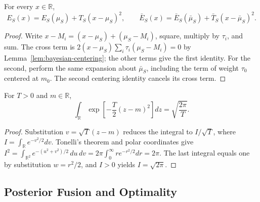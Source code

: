 \begin{mosaiclemma}\label{lem:bayesian-squares}
For every $x\in\mathbb{R}$,
\begin{equation}\label{eq:bayesian-square-completion}
E_S(x)=E_S(\mu_S)+T_S(x-\mu_S)^2,\qquad
\bar E_S(x)=\bar E_S(\bar\mu_S)+\bar T_S(x-\bar\mu_S)^2.
\end{equation}
\end{mosaiclemma}
\begin{proof}
Write $x-M_i=(x-\mu_S)+(\mu_S-M_i)$, square, multiply by $\tau_i$, and sum. The cross term is $2(x-\mu_S)\sum_i\tau_i(\mu_S-M_i)=0$ by Lemma~\ref{lem:bayesian-centering}; the other terms give the first identity. For the second, perform the same expansion about $\bar\mu_S$, including the term of weight $\tau_0$ centered at $m_0$. The second centering identity cancels its cross term.
\end{proof}

\begin{mosaiclemma}\label{lem:bayesian-normalization}
For $T>0$ and $m\in\mathbb{R}$,
\begin{equation}
\int_{\mathbb{R}}\exp\!\left[-\frac{T}{2}(z-m)^2\right]dz=\sqrt{\frac{2\pi}{T}}.
\end{equation}
\end{mosaiclemma}
\begin{proof}
Substitution $v=\sqrt{T}(z-m)$ reduces the integral to $I/\sqrt{T}$, where $I=\int_{\mathbb{R}}e^{-v^2/2}dv$. Tonelli's theorem and polar coordinates give $I^2=\int_{\mathbb{R}^2}e^{-(u^2+v^2)/2}\,du\,dv=2\pi\int_0^\infty r e^{-r^2/2}dr=2\pi$. The last integral equals one by substitution $w=r^2/2$, and $I>0$ yields $I=\sqrt{2\pi}$.
\end{proof}

\subsection{Posterior Fusion and Optimality}

